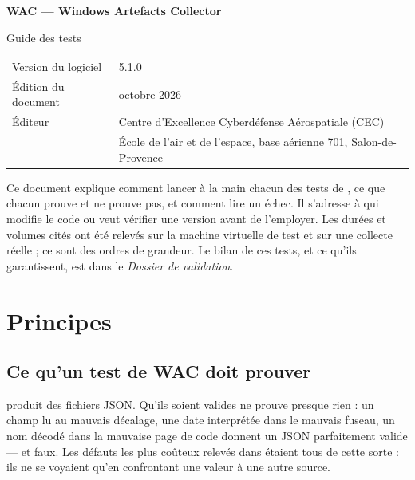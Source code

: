 \documentclass[11pt,a4paper,oneside]{report}
\begin{document}

\thispagestyle{empty}
\vspace*{\fill}
{\color{marine}\Large\bfseries WAC — Windows Artefacts Collector}\par
{\color{bleu}Guide des tests}\par
\medskip
\begin{tabular}{@{}ll@{}}
Version du logiciel & 5.1.0 \\
Édition du document & octobre 2026 \\
Éditeur & Centre d'Excellence Cyberdéfense Aérospatiale (CEC) \\
        & École de l'air et de l'espace, base aérienne 701, Salon-de-Provence \\
\end{tabular}

\bigskip
{\small\color{gris}Ce document explique comment lancer à la main chacun des
tests de \wac{}, ce que chacun prouve et ne prouve pas, et comment lire un
échec. Il s'adresse à qui modifie le code ou veut vérifier une version avant
de l'employer. Les durées et volumes cités ont été relevés sur la machine
virtuelle de test et sur une collecte réelle ; ce sont des ordres de
grandeur. Le bilan de ces tests, et ce qu'ils garantissent, est dans le
\emph{Dossier de validation}.}
\vspace*{2cm}
\clearpage

\tableofcontents

\chapter{Principes}

\section{Ce qu'un test de WAC doit prouver}

\wac{} produit des fichiers JSON. Qu'ils soient valides ne prouve presque rien :
un champ lu au mauvais décalage, une date interprétée dans le mauvais fuseau,
un nom décodé dans la mauvaise page de code donnent un JSON parfaitement
valide — et faux. Les défauts les plus coûteux relevés dans \wac{} étaient tous
de cette sorte : ils ne se voyaient qu'en confrontant une valeur à une autre
source.
\end{document}
